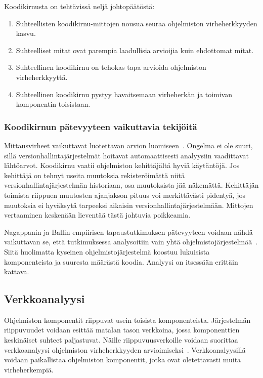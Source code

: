 \documentclass[finnish]{../tktltiki2}
\theoremstyle{definition}
\theoremstyle{remark}
\begin{document}
\noindent Koodikirnusta on tehtävissä neljä johtopäätöstä:

\begin{enumerate}

    \item Suhteellisten koodikirnu-mittojen nousua seuraa ohjelmiston virheherkkyyden kasvu.

    \item Suhteelliset mitat ovat parempia laadullisia arvioijia kuin ehdottomat mitat.

    \item Suhteellinen koodikirnu on tehokas tapa arvioida ohjelmiston virheherkkyyttä.

    \item Suhteellinen koodikirnu pystyy havaitsemaan virheherkän ja toimivan komponentin toisistaan.

\end{enumerate}

\subsubsection{Koodikirnun pätevyyteen vaikuttavia tekijöitä}

Mittausvirheet vaikuttavat luotettavan arvion luomiseen~\cite{NB05}. Ongelma ei ole suuri, sillä 
versionhallintajärjestelmät hoitavat automaattisesti analyysiin vaadittavat lähtöarvot. Koodikirnu vaatii ohjelmiston 
kehittäjältä hyviä käytäntöjä. Jos kehittäjä on tehnyt useita muutoksia rekisteröimättä niitä 
versionhallintajärjestelmän historiaan, osa muutoksista jää näkemättä. Kehittäjän toimista riippuen muutosten ajanjakson 
pituus voi merkittävästi pidentyä, jos muutoksia ei hyväksytä tarpeeksi aikaisin versionhallintajärjestelmään. Mittojen 
vertaaminen keskenään lieventää tästä johtuvia poikkeamia.

    Nagappanin ja Ballin empiirisen tapaustutkimuksen pätevyyteen voidaan nähdä vaikuttavan se, että tutkimuksessa 
analysoitiin vain yhtä ohjelmistojärjestelmää~\cite{NB05}. Siitä huolimatta kyseinen ohjelmistojärjestelmä koostuu 
lukuisista komponenteista ja suuresta määrästä koodia. Analyysi on itsessään erittäin kattava.

\subsection{Verkkoanalyysi}

Ohjelmiston komponentit riippuvat usein toisista komponenteista. Järjes\-telmän riippuvuudet voidaan esittää matalan 
tason verkkoina, jossa komponenttien keskinäiset suhteet paljastuvat. Näille riippuvuusverkoille voidaan suorittaa 
verkkoanalyysi ohjelmiston virheherkkyyden arvioimiseksi~\cite{ZN08}. Verkkoanalyysillä voidaan paikallistaa ohjelmiston 
komponentit, jotka ovat oletettavasti muita virheherkempiä.
\end{document}
